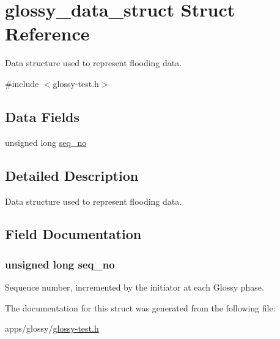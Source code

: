 \hypertarget{structglossy__data__struct}{
\section{glossy\_\-data\_\-struct Struct Reference}
\label{structglossy__data__struct}
}


Data structure used to represent flooding data.  




{\ttfamily \#include $<$glossy-\/test.h$>$}

\subsection*{Data Fields}
\begin{DoxyCompactItemize}
\item 
unsigned long \hyperlink{structglossy__data__struct_acc93b3a0d94ee20334cb4053f7e69278}{seq\_\-no}
\end{DoxyCompactItemize}


\subsection{Detailed Description}
Data structure used to represent flooding data. 

\subsection{Field Documentation}
\hypertarget{structglossy__data__struct_acc93b3a0d94ee20334cb4053f7e69278}{
\subsubsection[{seq\_\-no}]{\setlength{\rightskip}{0pt plus 5cm}unsigned long {\bf seq\_\-no}}}
\label{structglossy__data__struct_acc93b3a0d94ee20334cb4053f7e69278}
Sequence number, incremented by the initiator at each Glossy phase. 

The documentation for this struct was generated from the following file:\begin{DoxyCompactItemize}
\item 
apps/glossy/\hyperlink{glossy-test_8h}{glossy-\/test.h}\end{DoxyCompactItemize}
